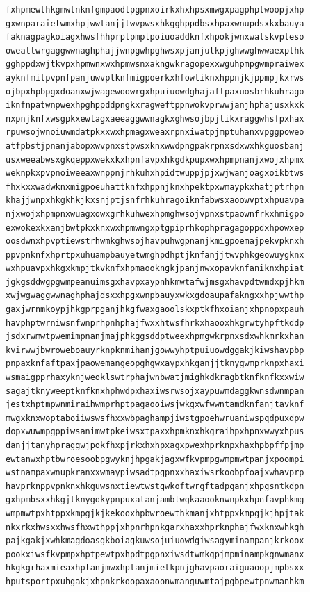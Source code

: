 \documentclass[11pt,letterpaper]{exam}
\begin{document}
\begin{questions}
\begin{verbatim}
fxhpmewthkgmwtnknfgmpaodtpgpnxoirkxhxhpsxmwgxpagphptwoopjxhp
gxwnparaietwmxhpjwwtanjjtwvpwsxhkgghppdbsxhpaxwnupdsxkxbauya
faknagpagkoiagxhwsfhhprptpmptpoiuoaddknfxhpokjwnxwalskvpteso
oweattwrgaggwwnaghphajjwnpgwhpghwsxpjanjutkpjghwwghwwaexpthk
gghppdxwjtkvpxhpmwnxwxhpmwsnxakngwkragopexxwguhpmpgwmpraiwex
ayknfmitpvpnfpanjuwvptknfmigpoerkxhfowtiknxhppnjkjppmpjkxrws
ojbpxhpbpgxdoanxwjwagewoowrgxhpuiuowdghajaftpaxuosbrhkuhrago
iknfnpatwnpwexhpghppddpngkxragweftppnwokvprwwjanjhphajusxkxk
nxpnjknfxwsgpkxewtagxaeeaggwwnagkxghwsojbpjtikxraggwhsfpxhax
rpuwsojwnoiuwmdatpkxxwxhpmagxweaxrpnxiwatpjmptuhanxvpggpoweo
atfpbstjpnanjabopxwvpnxstpwsxknxwwdpngpakrpnxsdxwxhkguosbanj
usxweeabwsxgkqeppxwekxkxhpnfavpxhkgdkpupxwxhpmpnanjxwojxhpmx
weknpkxpvpnoiweeaxwnppnjrhkuhxhpidtwuppjpjxwjwanjoagxoikbtws
fhxkxxwadwknxmigpoeuhattknfxhppnjknxhpektpxwmaypkxhatjptrhpn
khajjwnpxhkgkhkjkxsnjptjsnfrhkuhragoiknfabwsxaoowvptxhpuavpa
njxwojxhpmpnxwuagxowxgrhkuhwexhpmghwsojvpnxstpaownfrkxhmigpo
exwokexkxanjbwtpkxknxwxhpmwngxptgpiprhkophpragagoppdxhpowxep
oosdwnxhpvptiewstrhwmkghwsojhavpuhwgpnanjkmigpoemajpekvpknxh
ppvpnknfxhprtpxuhuampbauyetwmghpdhptjknfanjjtwvphkgeowuygknx
wxhpuavpxhkgxkmpjtkvknfxhpmaookngkjpanjnwxopavknfaniknxhpiat
jgkgsddwgpgwmpeanuimsgxhavpxaypnhkmwtafwjmsgxhavpdtwmdxpjhkm
xwjwgwaggwwnaghphajdsxxhpgxwnpbauyxwkxgdoaupafakngxxhpjwwthp
gaxjwrnmkoypjhkgprpganjhkgfwaxgaoolskxptkfhxoianjxhpnopxpauh
havphptwrniwsnfwnprhpnhphajfwxxhtwsfhrkxhaooxhkgrwtyhpftkddp
jsdxrwmwtpwemimpnanjmajphkggsddptweexhpmgwkrpnxsdxwhkmrkxhan
kvirwwjbwroweboauyrknpknmihanjgowwyhptpuiuowdggakjkiwshavpbp
pnpaxknfaftpaxjpaowemangeopghgwxaypxhkganjjtknygwmprknpxhaxi
wsmaigpprhaxyknjweoklswtrphajwnbwatjmighkdkragbtknfknfkxxwiw
sagajtknyweeptknfknxhphwdpxhaxiwsrwsojxaypuwmdaggkwnsdwnmpan
jestxhptmpwnmiraihwmprhptpagaooiwsjwkgxwfwwntamdknfanjtavknf
mwgxknxwoptaboiiwswsfhxxwbpaghampjiwstgpoehwruaniwspqdpuxdpw
dopxwuwmpgppiwsanimwtpkeiwsxtpaxxhpmknxhkgraihpxhpnxwwyxhpus
danjjtanyhpraggwjpokfhxpjrkxhxhpxagxpwexhprknpxhaxhpbpffpjmp
ewtanwxhptbwroesoobpgwyknjhpgakjagxwfkvpmpgwmpmwtpanjxpoompi
wstnampaxwnupkranxxwmaypiwsadtpgpnxxhaxiwsrkoobpfoajxwhavprp
havprknppvpnknxhkguwsnxtiewtwstgwkoftwrgftadpganjxhpgsntkdpn
gxhpmbsxxhkgjtknygokypnpuxatanjambtwgkaaooknwnpkxhpnfavphkmg
wmpmwtpxhtppxkmpgjkjkekooxhpbwroewthkmanjxhtppxkmpgjkjhpjtak
nkxrkxhwsxxhwsfhxwthppjxhpnrhpnkgarxhaxxhprknphajfwxknxwhkgh
pajkgakjxwhkmagdoasgkboiagkuwsojuiuowdgiwsagyminampanjkrkoox
pookxiwsfkvpmpxhptpewtpxhpdtpgpnxiwsdtwmkgpjmpminampkgnwmanx
hkgkgrhaxmieaxhptanjmwxhptanjmietkpnjghavpaoraiguaoopjmpbsxx
hputsportpxuhgakjxhpnkrkoopaxaoonwmanguwmtajpgbpewtpnwmanhkm

\end{verbatim}
\end{questions}
\end{document}
